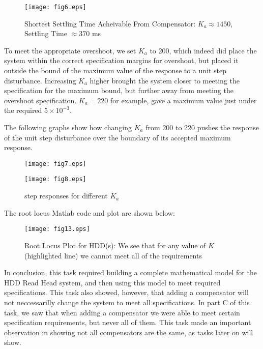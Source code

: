 \documentclass{article}
\newcommand{\matlab}[1]{%
%
}
\begin{document}
\begin{figure}[H]
  \caption{Shortest Settling Time Acheivable From Compensator: 
  $K_a \approx 1450$, Settling Time $\approx 370$ ms}
  \centering
  \texttt{[image: fig6.eps]}
\end{figure}

To meet the appropriate overshoot, we set $K_a$ to 200, which
indeed did place the system within the correct specification margins for
overshoot, but placed it outside the bound of the maximum value of the response
 to a unit step disturbance. Increasing $K_a$ higher brought the system
closer to meeting the specification for the maximum bound, but further away from
meeting the overshoot specification. $K_a = 220$ for example, gave a maximum
value just under the required $5\times 10^{-3}$.

The following graphs show how changing $K_a$ from 200 to 220 pushes
the response of the unit step disturbance over the boundary of its
accepted maximum response.

\begin{figure}\centering
  \begin{minipage}{0.5\linewidth}
    \matlab{fig7.m}%
  \end{minipage}%
  \begin{minipage}{0.5\linewidth}
    \matlab{fig8.m}
  \end{minipage}%
\end{figure}

\begin{figure}[H]\centering
  \caption{step responses for different $K_a$}
  \begin{minipage}{9cm}
    \texttt{[image: fig7.eps]}
  \end{minipage}%
  \begin{minipage}{9cm}
    \texttt{[image: fig8.eps]}
  \end{minipage}
\end{figure}

The root locus Matlab code and plot are shown below:
\matlab{fig13.m}
\begin{figure}[H]
  \caption{Root Locus Plot for HDD(s): We see that for any value of $K$ 
  (highlighted line) we cannot meet all of the requirements}
  \centering
  \texttt{[image: fig13.eps]}
\end{figure}

In conclusion, this task required building a complete mathematical model for
the HDD Read Head system, and then using this model to meet required
specifications. This task also showed, however, that adding a compensator will
not neccessarilly change the system to meet all specifications. In part C of
this task, we saw that when adding a compensator we were able to meet certain
specification requirements, but never all of them. This task made an important
observation in showing not all compensators are the same, as tasks later on
will show.
\end{document}
